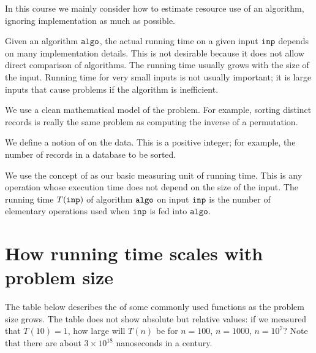 In this course we mainly consider how to estimate resource use of an algorithm, 
ignoring implementation as much as possible.  

Given an algorithm $\operatorname{\text{\texttt{algo}}}$, the actual running time on a given
input $\operatorname{\text{\texttt{inp}}}$ depends on many implementation details. This is not desirable
because it does not allow direct comparison of algorithms. 
The running time usually grows with the size of the input.
Running time for very small inputs is not usually important; it is large
inputs that cause problems if the algorithm is inefficient. 

We use a clean mathematical model of the problem. 
For example, sorting distinct records is really the same problem as computing the inverse of a permutation. 

\begin{Definition}
We define a notion of  on the data. 
This is a positive integer; for example, the number of records in a database to be sorted.

We use the concept of  as our basic measuring unit of running time. 
This is any operation whose execution time does not depend on the size of the input.
The running time $T(\operatorname{\text{\texttt{inp}}})$ of algorithm $\operatorname{\text{\texttt{algo}}}$ on input $\operatorname{\text{\texttt{inp}}}$ is the 
number of elementary operations used when $\operatorname{\text{\texttt{inp}}}$ is fed into $\operatorname{\text{\texttt{algo}}}$.
\end{Definition}

\pagebreak[4]
\section{How running time scales with problem size}
The table below describes the  of some commonly used functions as the problem size grows.
The table does not show absolute but relative values: if we measured that $T(10)=1$, how large will $T(n)$ be for $n=100$, $n=1000$, $n=10^7$?
Note that there are about $3 \times 10^{18}$ nanoseconds in a century.

